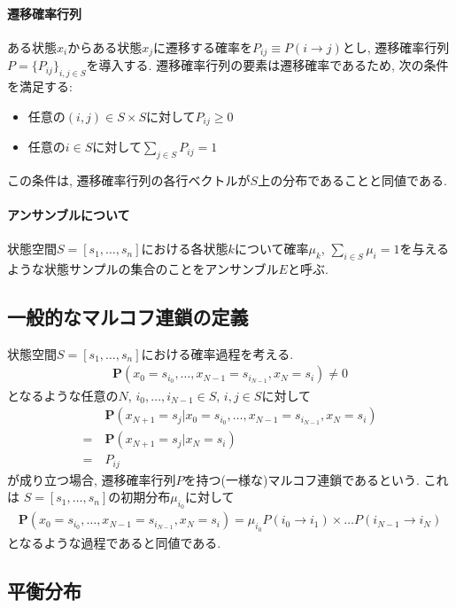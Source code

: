 \paragraph{遷移確率行列}
ある状態$x_{i}$からある状態$x_{j}$に遷移する確率を$P_{ij} \equiv P(i \to j)$とし, 遷移確率行列$P=\{P_{ij}\}_{i,j \in S}$を導入する.
遷移確率行列の要素は遷移確率であるため, 次の条件を満足する:
\begin{itemize}
\item 任意の$(i, j) \in S \times S$に対して$P_{ij} \ge 0$
\item 任意の$i \in S$に対して$\sum_{j \in S} P_{ij} = 1$
\end{itemize}
この条件は, 遷移確率行列の各行ベクトルが$S$上の分布であることと同値である.

\paragraph{アンサンブルについて}
状態空間$S = [s_{1}, \ldots, s_{n}]$における各状態$k$について確率$\mu_{k}$, $\sum_{i \in S}\mu_{i}=1$を与えるような状態サンプルの集合のことをアンサンブル$E$と呼ぶ.


\subsection{一般的なマルコフ連鎖の定義}
状態空間$S = [s_{1}, \ldots, s_{n}]$における確率過程を考える.
\begin{align}
    \bm{P}(x_{0} = s_{i_0},\ldots, x_{N-1} = s_{i_{N-1}}, x_{N} = s_{i}) \neq 0
\end{align}
となるような任意の$N$, $i_0, \ldots, i_{N-1} \in S$, $i,j \in S$に対して
\begin{align}
&\bm{P}(x_{N+1} = s_{j} | x_{0} = s_{i_0},\ldots, x_{N-1} = s_{i_{N-1}}, x_{N} = s_{i}) \\
=~&\bm{P}(x_{N+1} = s_{j} | x_{N} = s_{i}) \\
=~&P_{ij}
\end{align}
が成り立つ場合, 遷移確率行列$P$を持つ(一様な)マルコフ連鎖であるという.
これは $S = [s_{1}, \ldots, s_{n}]$の初期分布$\mu_{i_0}$に対して
\begin{align}
    \bm{P}(x_{0} = s_{i_0},\ldots, x_{N-1} = s_{i_{N-1}}, x_{N} = s_{i})
    =
    \mu_{i_0} P(i_0 \to i_1) \times \ldots P(i_{N-1} \to i_{N})
\end{align}
となるような過程であると同値である.


\subsection{平衡分布}

